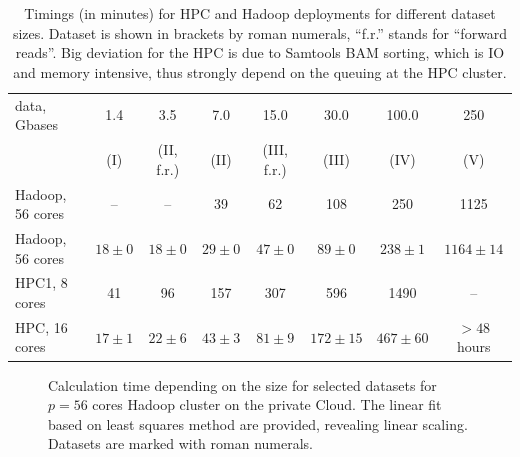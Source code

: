 \documentclass[11pt, oneside]{article}   	%
\begin{document}
\begin{table}[htdp]
\small

\caption{Timings  (in minutes) for HPC and  Hadoop deployments for different dataset sizes.    Dataset is shown in brackets by roman numerals, ``f.r.'' stands for ``forward reads''. Big deviation for the HPC is due to Samtools BAM sorting, which is IO and memory intensive, thus strongly depend on the queuing at the HPC cluster.}
\begin{center}
\begin{tabular}{|l|c|c|c|c|c|c|c|}

data, Gbases		&	1.4	&	3.5		&	7.0		&	15.0		&	30.0		&	100.0	&	250 	\\
				&	(I)	&	(II, f.r.)	&	(II)		&	(III, f.r.)	&	(III)		&	(IV)		&	(V)\\
\hline
Hadoop, 56 cores&--&	--	&39		&62	&108	&250&1125\\
Hadoop, 56 cores		&	$18\pm0	$	&	$18\pm0	$	&	$29\pm0$	&	$47\pm0	$	&	$89\pm0$	&	$238\pm1$		&	$1164\pm14$\\
HPC1, 8 cores&	41&	96	&157	&307	&596	&1490&--\\
HPC, 16 cores	&	$17\pm1$	&	$22\pm6$	&	$43\pm3$	&	$81\pm9$	&	$172\pm15$		&	$467\pm60$	& $>48$ hours\\

\end{tabular}
\end{center}
\label{table:4}
\normalsize
\end{table}%




\begin{figure}
	
	\caption{Calculation time depending on the  size for selected datasets for~$p=56$ cores Hadoop cluster on the private Cloud. The linear fit based on least squares method are provided, revealing  linear scaling. Datasets are marked with roman numerals.}
	\label{fig:fig1}
\end{figure}
\end{document}
